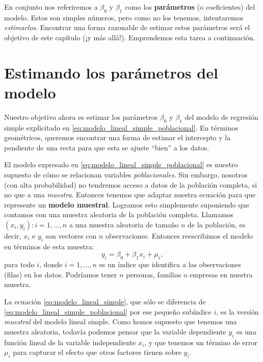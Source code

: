 \documentclass{report}\usepackage[]{graphicx}\usepackage[]{color}
\newcommand*{\kw}[1]{\textbf{#1}\index{#1}}
\begin{document}
En conjunto nos referiremos a $\beta_0$ y $\beta_1$ como los \kw{parámetros} (o coeficientes) del modelo.
Estos son simples números, pero como no los tenemos, intentaremos \emph{estimarlos}.
Encontrar una forma razonable de estimar estos parámetros será el objetivo de este capítulo (¡y más allá!).
Emprendemos esta tarea a continuación.

\section{Estimando los parámetros del modelo}

Nuestro objetivo ahora es estimar los parámetros $\beta_0$ y $\beta_1$ del modelo de regresión simple explicitado en \eqref{eq:modelo_lineal_simple_poblacional}. En términos geométricos, queremos encontrar una forma de estimar el intercepto y la pendiente de una recta para que esta se ajuste ``bien'' a los datos.

El modelo expresado en \eqref{eq:modelo_lineal_simple_poblacional} es nuestro supuesto de cómo se relacionan variables \emph{poblacionales}.
Sin embargo, nosotros (con alta probabilidad) no tendremos acceso a datos de la población completa, si no que a una \emph{muestra}.
Entonces tenemos que adaptar nuestra ecuación para que represente un \kw{modelo muestral}.
Logramos esto simplemente suponiendo que contamos con una muestra aleatoria de la población completa. Llamamos ${(x_i, y_i): i = 1, \ldots, n}$ a una muestra aleatoria de tamaño $n$ de la población, es decir, $x_i$ e $y_i$ son vectores con $n$ observaciones. Entonces reescribimos el modelo en términos de esta muestra:
\begin{equation}
y_i = \beta_0 + \beta_1 x_i + \mu_i,
\label{eq:modelo_lineal_simple}
\end{equation}
para todo $i$, donde $i = 1, \ldots, n$ es un índice que identifica a las observaciones (filas) en los datos.
Podríamos tener $n$ personas, familias o empresas en nuestra muestra.

La ecuación \eqref{eq:modelo_lineal_simple}, que sólo se diferencia de \eqref{eq:modelo_lineal_simple_poblacional} por ese pequeño subíndice $i$, es la versión \emph{muestral} del modelo lineal simple.
Como hemos supuesto que tenemos una muestra aleatoria, todavía podemos pensar que la variable dependiente $y_i$ es una función lineal de la variable independiente $x_i$, y que tenemos un término de error $\mu_i$ para capturar el efecto que otros factores tienen sobre $y_i$.
\end{document}
